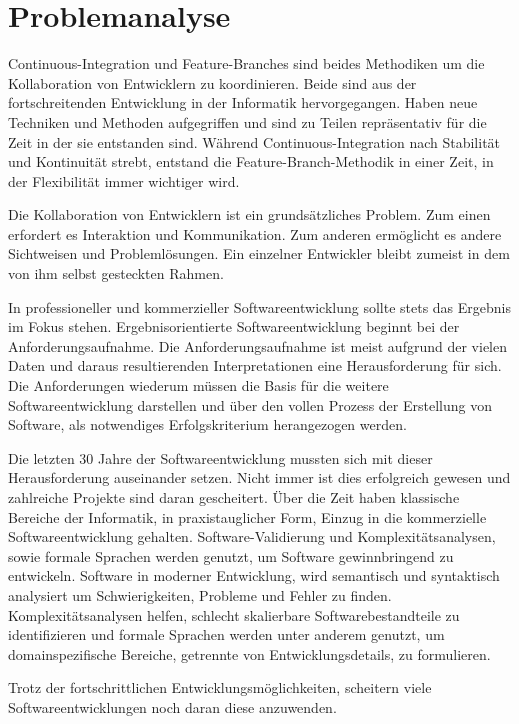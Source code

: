 \chapter{Problemanalyse}

Continuous-Integration und Feature-Branches sind beides Methodiken um die Kollaboration von Entwicklern zu koordinieren. Beide sind aus der fortschreitenden Entwicklung in der Informatik hervorgegangen. Haben neue Techniken und Methoden aufgegriffen und sind zu Teilen repräsentativ für die Zeit in der sie entstanden sind. Während Continuous-Integration nach Stabilität und Kontinuität strebt, entstand die Feature-Branch-Methodik in einer Zeit, in der Flexibilität immer wichtiger wird.

Die Kollaboration von Entwicklern ist ein grundsätzliches Problem. Zum einen erfordert es Interaktion und Kommunikation. Zum anderen ermöglicht es andere Sichtweisen und Problemlösungen. Ein einzelner Entwickler bleibt zumeist in dem von ihm selbst gesteckten Rahmen.

In professioneller und kommerzieller Softwareentwicklung sollte stets das Ergebnis im Fokus stehen. Ergebnisorientierte Softwareentwicklung beginnt bei der Anforderungsaufnahme. Die Anforderungsaufnahme ist meist aufgrund der vielen Daten und daraus resultierenden Interpretationen eine Herausforderung für sich. Die Anforderungen wiederum müssen die Basis für die weitere Softwareentwicklung darstellen und über den vollen Prozess der Erstellung von Software, als notwendiges Erfolgskriterium herangezogen werden.

Die letzten 30 Jahre der Softwareentwicklung mussten sich mit dieser Herausforderung auseinander setzen. Nicht immer ist dies erfolgreich gewesen und zahlreiche Projekte sind daran gescheitert. Über die Zeit haben klassische Bereiche der Informatik, in praxistauglicher Form, Einzug in die kommerzielle Softwareentwicklung gehalten. Software-Validierung und Komplexitätsanalysen, sowie formale Sprachen werden genutzt, um Software gewinnbringend zu entwickeln. Software in moderner Entwicklung, wird semantisch und syntaktisch analysiert um Schwierigkeiten, Probleme und Fehler zu finden. Komplexitätsanalysen helfen, schlecht skalierbare Softwarebestandteile zu identifizieren und formale Sprachen werden unter anderem genutzt, um domainspezifische Bereiche, getrennte von Entwicklungsdetails, zu formulieren.

Trotz der fortschrittlichen Entwicklungsmöglichkeiten, scheitern viele Softwareentwicklungen noch daran diese anzuwenden.

